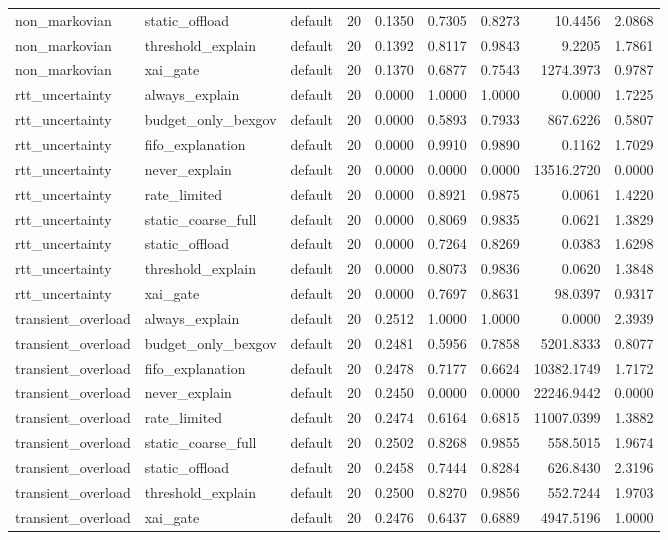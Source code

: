 \begin{table}[t]
\begin{tabular}{lllrrrrrr}
non\_markovian & static\_offload & default & 20 & 0.1350 & 0.7305 & 0.8273 & 10.4456 & 2.0868 \\
non\_markovian & threshold\_explain & default & 20 & 0.1392 & 0.8117 & 0.9843 & 9.2205 & 1.7861 \\
non\_markovian & xai\_gate & default & 20 & 0.1370 & 0.6877 & 0.7543 & 1274.3973 & 0.9787 \\
rtt\_uncertainty & always\_explain & default & 20 & 0.0000 & 1.0000 & 1.0000 & 0.0000 & 1.7225 \\
rtt\_uncertainty & budget\_only\_bexgov & default & 20 & 0.0000 & 0.5893 & 0.7933 & 867.6226 & 0.5807 \\
rtt\_uncertainty & fifo\_explanation & default & 20 & 0.0000 & 0.9910 & 0.9890 & 0.1162 & 1.7029 \\
rtt\_uncertainty & never\_explain & default & 20 & 0.0000 & 0.0000 & 0.0000 & 13516.2720 & 0.0000 \\
rtt\_uncertainty & rate\_limited & default & 20 & 0.0000 & 0.8921 & 0.9875 & 0.0061 & 1.4220 \\
rtt\_uncertainty & static\_coarse\_full & default & 20 & 0.0000 & 0.8069 & 0.9835 & 0.0621 & 1.3829 \\
rtt\_uncertainty & static\_offload & default & 20 & 0.0000 & 0.7264 & 0.8269 & 0.0383 & 1.6298 \\
rtt\_uncertainty & threshold\_explain & default & 20 & 0.0000 & 0.8073 & 0.9836 & 0.0620 & 1.3848 \\
rtt\_uncertainty & xai\_gate & default & 20 & 0.0000 & 0.7697 & 0.8631 & 98.0397 & 0.9317 \\
transient\_overload & always\_explain & default & 20 & 0.2512 & 1.0000 & 1.0000 & 0.0000 & 2.3939 \\
transient\_overload & budget\_only\_bexgov & default & 20 & 0.2481 & 0.5956 & 0.7858 & 5201.8333 & 0.8077 \\
transient\_overload & fifo\_explanation & default & 20 & 0.2478 & 0.7177 & 0.6624 & 10382.1749 & 1.7172 \\
transient\_overload & never\_explain & default & 20 & 0.2450 & 0.0000 & 0.0000 & 22246.9442 & 0.0000 \\
transient\_overload & rate\_limited & default & 20 & 0.2474 & 0.6164 & 0.6815 & 11007.0399 & 1.3882 \\
transient\_overload & static\_coarse\_full & default & 20 & 0.2502 & 0.8268 & 0.9855 & 558.5015 & 1.9674 \\
transient\_overload & static\_offload & default & 20 & 0.2458 & 0.7444 & 0.8284 & 626.8430 & 2.3196 \\
transient\_overload & threshold\_explain & default & 20 & 0.2500 & 0.8270 & 0.9856 & 552.7244 & 1.9703 \\
transient\_overload & xai\_gate & default & 20 & 0.2476 & 0.6437 & 0.6889 & 4947.5196 & 1.0000 \\
\bottomrule
\end{tabular}
\end{table}

